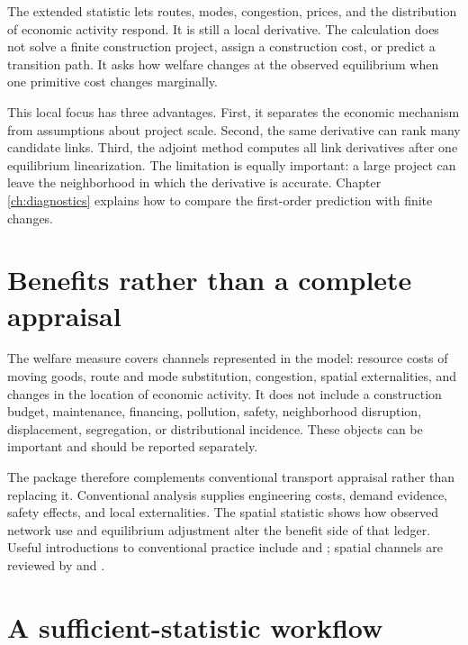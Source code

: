 The extended statistic lets routes, modes, congestion, prices, and the
distribution of economic activity respond. It is still a local derivative.
The calculation does not solve a finite construction project, assign a
construction cost, or predict a transition path. It asks how welfare changes
at the observed equilibrium when one primitive cost changes marginally.

This local focus has three advantages. First, it separates the economic
mechanism from assumptions about project scale. Second, the same derivative
can rank many candidate links. Third, the adjoint method computes all link
derivatives after one equilibrium linearization. The limitation is equally
important: a large project can leave the neighborhood in which the derivative
is accurate. Chapter \ref{ch:diagnostics} explains how to compare the
first-order prediction with finite changes.

\section{Benefits rather than a complete appraisal}

The welfare measure covers channels represented in the model: resource costs
of moving goods, route and mode substitution, congestion, spatial
externalities, and changes in the location of economic activity. It does not
include a construction budget, maintenance, financing, pollution, safety,
neighborhood disruption, displacement, segregation, or distributional
incidence. These objects can be important and should be reported separately.


The package therefore complements conventional transport appraisal rather
than replacing it. Conventional analysis supplies engineering costs, demand
evidence, safety effects, and local externalities. The spatial statistic shows
how observed network use and equilibrium adjustment alter the benefit side of
that ledger. Useful introductions to conventional practice include
\citet{SmallVerhoefLindsey2024} and \citet{dePalmaEtAl2011Handbook}; spatial
channels are reviewed by \citet{ReddingTurner2015} and
\citet{donaldson2025transport}.

\section{A sufficient-statistic workflow}

